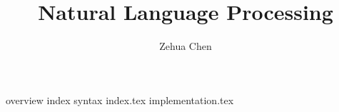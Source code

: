 \documentclass[letterpaper, 11pt]{report}
\title{Natural Language Processing}
\author{Zehua Chen}
\begin{document}
  \maketitle
  \tableofcontents

  \setmainstyles

  {overview}
  {index}
  {syntax}
  {index.tex}
  {implementation.tex}

\end{document}
